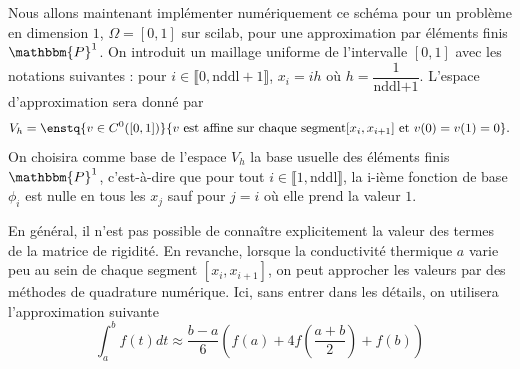 \documentclass[11pt,a4paper]{article}
\begin{document}
Nous allons maintenant implémenter numériquement ce schéma pour un problème en dimension $1$, $\Omega =  [0,1]$ sur scilab, pour une approximation par éléments finis $\mathbbm{P}^1$. On introduit un maillage uniforme de l'intervalle $[0,1]$ avec les notations suivantes : pour $i \in \llbracket 0, \text{nddl}+1 \rrbracket$, $x_i = i h$ où $h = \dfrac{1}{\text{nddl+1}}$. L'espace d'approximation sera donné par 
\[ V_{h} = \enstq{v \in C^0([0,1])}{v \text{ est affine sur chaque segment} [x_i, x_{i+1}] \text{ et } v(0) = v(1) = 0}.\]
On choisira comme base de l'espace $V_h$ la base usuelle des éléments finis $\mathbbm{P}^1$, c'est-à-dire que pour tout $i \in \llbracket 1,\text{nddl}\rrbracket$, la i-ième fonction de base $\phi_i$ est nulle en tous les $x_j$ sauf pour $j = i$ où elle prend la valeur $1$. 


En général, il n'est pas possible de connaître explicitement la valeur des termes de la matrice de rigidité. En revanche, lorsque la conductivité thermique $a$ varie peu au sein de chaque segment $[x_i,x_{i+1}]$, on peut approcher les valeurs par des méthodes de quadrature numérique. Ici, sans entrer dans les détails, on utilisera l'approximation suivante
\[\int_{a}^{b}f(t)dt \approx \dfrac{b-a}{6}\left(f(a) + 4f\left(\dfrac{a+b}{2}\right) + f(b) \right)\]
\end{document}
